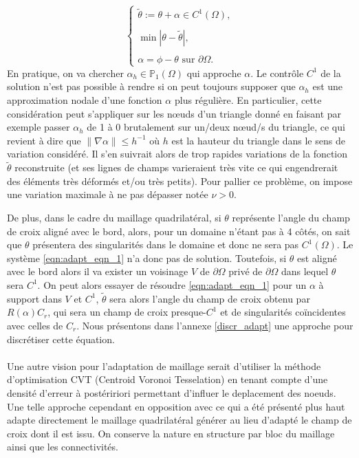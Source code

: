 \begin{equation}
\begin{cases}
    \tilde{\theta} := \theta + \alpha \in C^1(\Omega), \\\\
    \min \left\lvert \theta - \tilde{\theta} \right\rvert, \\\\
    \alpha = \phi - \theta \text{ sur } \partial\Omega.
\end{cases}
\label{eqn:adapt_eqn_1}
\end{equation}
En pratique, on va chercher $\alpha_h \in\mathbb{P}_1(\Omega)$ qui approche $\alpha$. Le contrôle $C^1$ de la solution n'est pas possible à rendre si on peut toujours supposer que $\alpha_h$ est une approximation nodale d'une fonction $\alpha$ plus régulière. En particulier, cette considération peut s'appliquer sur les nœuds d'un triangle donné en faisant par exemple passer $\alpha_h$ de 1 à 0 brutalement sur un/deux nœud/s du triangle, ce qui revient à dire que $\lVert \nabla\alpha \rVert \leq h^{-1}$ où $h$ est la hauteur du triangle dans le sens de variation considéré. Il s'en suivrait alors de trop rapides variations de la fonction $\tilde{\theta}$ reconstruite (et ses lignes de champs varieraient très vite ce qui engendrerait des éléments très déformés et/ou très petits). Pour pallier ce problème, on impose une variation maximale à ne pas dépasser notée $\nu > 0$.

De plus, dans le cadre du maillage quadrilatéral, si $\theta$ représente l’angle du champ de croix aligné avec le bord, alors, pour un domaine n’étant pas à 4 côtés, on sait que $\theta$ présentera des singularités dans le domaine et donc ne sera pas $C^1(\Omega)$. Le système \eqref{eqn:adapt_eqn_1} n’a donc pas de solution. Toutefois, si $\theta$ est aligné avec le bord alors il va exister un voisinage $V$ de $\partial\Omega$ privé de $\partial\Omega$ dans lequel $\theta$ sera $C^1$. On peut alors essayer de résoudre \eqref{eqn:adapt_eqn_1} pour un $\alpha$ à support dans $V$ et $C^1$, $\tilde{\theta}$ sera alors l’angle du champ de croix obtenu par $R(\alpha)C_r$, qui sera un champ de croix presque-$C^1$ et de singularités coïncidentes avec celles de $C_r$. Nous présentons dans l'annexe \ref{discr_adapt} une approche pour discrétiser cette équation.\\\\
Une autre vision pour l'adaptation de maillage serait d'utiliser la méthode d'optimisation CVT (Centroid Voronoi Tesselation) \cite{chen2004mesh} en tenant compte d'une densité d'erreur à postéririori permettant d'influer le deplacement des noeuds. Une telle approche cependant en opposition avec ce qui a été présenté plus haut adapte directement le maillage quadrilatéral générer au lieu d'adapté le champ de croix dont il est issu. On conserve la nature en structure par bloc du maillage ainsi que les connectivités.

